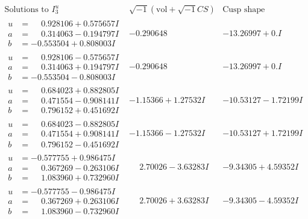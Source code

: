 \documentclass[1p]{elsarticle_modified}
\theoremstyle{definition}
\newcommand{\I}{\sqrt{-1}}
\begin{document}
$$\begin{array}{c|c|c}  
\text{Solutions to }I^u_{3}& \I (\text{vol} + \sqrt{-1}CS) & \text{Cusp shape}\\
 \hline 
\begin{aligned}
u &= \phantom{-}0.928106 + 0.575657 I \\
a &= \phantom{-}0.314063 - 0.194797 I \\
b &= -0.553504 + 0.808003 I\end{aligned}
 & -0.290648\phantom{ +0.000000I} & -13.26997 + 0. I\phantom{ +0.000000I} \\ \hline\begin{aligned}
u &= \phantom{-}0.928106 - 0.575657 I \\
a &= \phantom{-}0.314063 + 0.194797 I \\
b &= -0.553504 - 0.808003 I\end{aligned}
 & -0.290648\phantom{ +0.000000I} & -13.26997 + 0. I\phantom{ +0.000000I} \\ \hline\begin{aligned}
u &= \phantom{-}0.684023 + 0.882805 I \\
a &= \phantom{-}0.471554 - 0.908141 I \\
b &= \phantom{-}0.796152 + 0.451692 I\end{aligned}
 & -1.15366 + 1.27532 I & -10.53127 - 1.72199 I \\ \hline\begin{aligned}
u &= \phantom{-}0.684023 - 0.882805 I \\
a &= \phantom{-}0.471554 + 0.908141 I \\
b &= \phantom{-}0.796152 - 0.451692 I\end{aligned}
 & -1.15366 - 1.27532 I & -10.53127 + 1.72199 I \\ \hline\begin{aligned}
u &= -0.577755 + 0.986475 I \\
a &= \phantom{-}0.367269 - 0.263106 I \\
b &= \phantom{-}1.083960 + 0.732960 I\end{aligned}
 & \phantom{-}2.70026 - 3.63283 I & -9.34305 + 4.59352 I \\ \hline\begin{aligned}
u &= -0.577755 - 0.986475 I \\
a &= \phantom{-}0.367269 + 0.263106 I \\
b &= \phantom{-}1.083960 - 0.732960 I\end{aligned}
 & \phantom{-}2.70026 + 3.63283 I & -9.34305 - 4.59352 I \\ \hline\begin{aligned}

\end{aligned}
\end{array}$$
\end{document}
